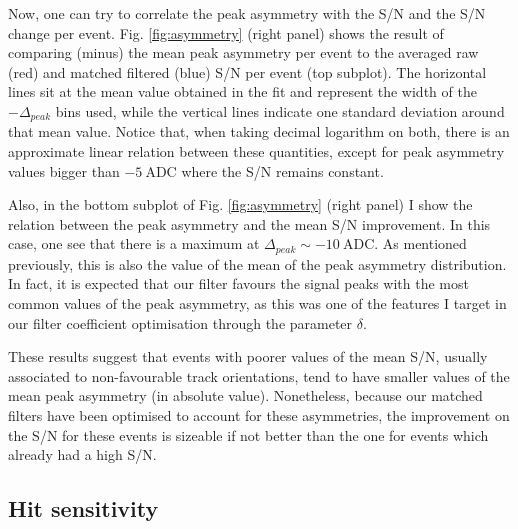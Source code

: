 Now, one can try to correlate the peak asymmetry with the S/N and the S/N change per event. Fig. \ref{fig:asymmetry} (right panel) shows the result of comparing (minus) the mean peak asymmetry per event to the averaged raw (red) and matched filtered (blue) S/N per event (top subplot). The horizontal lines sit at the mean value obtained in the fit and represent the width of the $-\Delta_{peak}$ bins used, while the vertical lines indicate one standard deviation around that mean value. Notice that, when taking decimal logarithm on both, there is an approximate linear relation between these quantities, except for peak asymmetry values bigger than $- 5 \ \mathrm{ADC}$ where the S/N remains constant.

Also, in the bottom subplot of Fig. \ref{fig:asymmetry} (right panel) I show the relation between the peak asymmetry and the mean S/N improvement. In this case, one see that there is a maximum at $\Delta_{peak} \sim -10 \ \mathrm{ADC}$. As mentioned previously, this is also the value of the mean of the peak asymmetry distribution. In fact, it is expected that our filter favours the signal peaks with the most common values of the peak asymmetry, as this was one of the features I target in our filter coefficient optimisation through the parameter $\delta$.

These results suggest that events with poorer values of the mean S/N, usually associated to non-favourable track orientations, tend to have smaller values of the mean peak asymmetry (in absolute value). Nonetheless, because our matched filters have been optimised to account for these asymmetries, the improvement on the S/N for these events is sizeable if not better than the one for events which already had a high S/N.

\subsection{Hit sensitivity}
\label{subsec:2.5.3}

